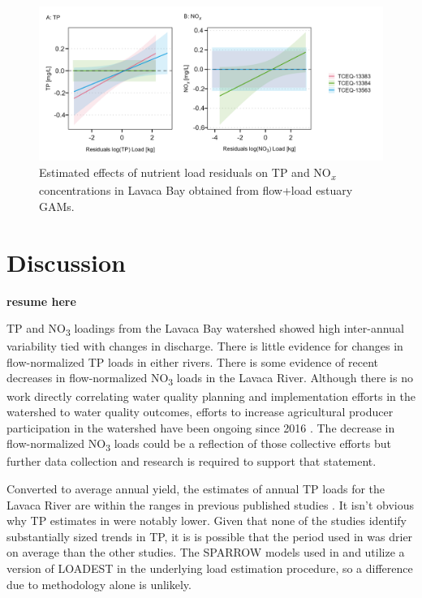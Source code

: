 \documentclass[sn-basic,referee,lineno,pdflatex]{sn-jnl}
\begin{document}
\begin{figure}

{\centering \includegraphics[width=1\linewidth,]{Schramm-2023-05-AS_files/figure-latex/fig7-1} 

}

\caption{Estimated effects of nutrient load residuals on TP and NO\textsubscript{\textit{x}} concentrations in Lavaca Bay obtained from flow+load estuary GAMs.}\label{fig:fig7}
\end{figure}

\hypertarget{discussion}{%
\section{Discussion}\label{discussion}}

\textbf{resume here}

TP and NO\textsubscript{3} loadings from the Lavaca Bay watershed showed
high inter-annual variability tied with changes in discharge. There is
little evidence for changes in flow-normalized TP loads in either
rivers. There is some evidence of recent decreases in flow-normalized
NO\textsubscript{3} loads in the Lavaca River. Although there is no work
directly correlating water quality planning and implementation efforts
in the watershed to water quality outcomes, efforts to increase
agricultural producer participation in the watershed have been ongoing
since 2016
\citep{schrammLavacaRiverWatershed2018, bertholdDirectMailingEducation2021}.
The decrease in flow-normalized NO\textsubscript{3} loads could be a
reflection of those collective efforts but further data collection and
research is required to support that statement.

Converted to average annual yield, the estimates of annual TP loads for
the Lavaca River are within the ranges in previous published studies
\citep[Table~\ref{tab:table5},][]{dunnTrendsNutrientInflows1996, rebichSourcesDeliveryNutrients2011, omaniEstimationSedimentNutrient2014, wise_spatially_2019}.
It isn't obvious why TP estimates in
\citet{dunnTrendsNutrientInflows1996} were notably lower. Given that
none of the studies identify substantially sized trends in TP, it is is
possible that the period used in \citet{dunnTrendsNutrientInflows1996}
was drier on average than the other studies. The SPARROW models used in
\citet{rebichSourcesDeliveryNutrients2011} and
\citet{wise_spatially_2019} utilize a version of LOADEST in the
underlying load estimation procedure, so a difference due to methodology
alone is unlikely.
\end{document}
